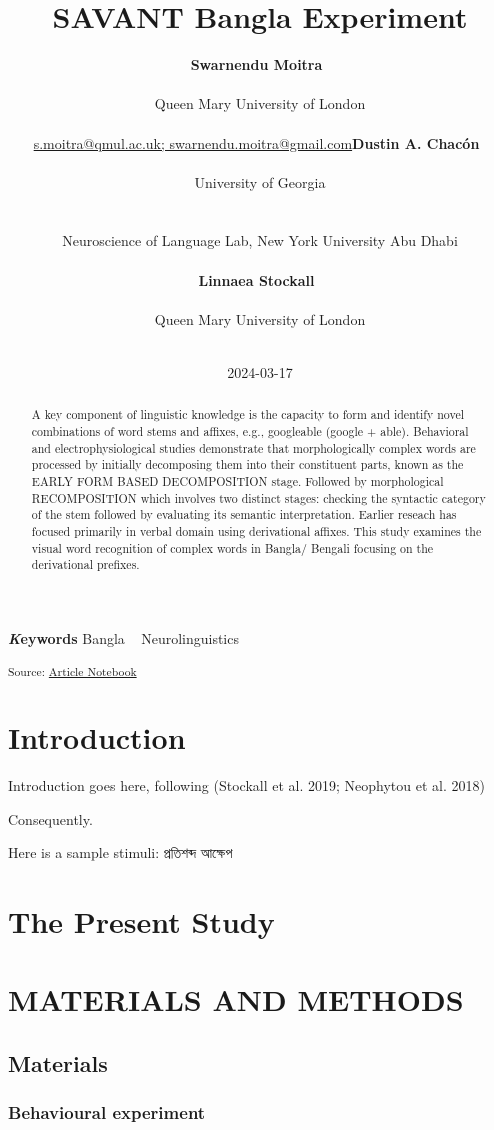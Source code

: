 \documentclass[
]{article}
\title{SAVANT Bangla Experiment}
\author{\textbf{Swarnendu
Moitra}~\orcidlink{0000-0001-6830-3284}\\\\Queen Mary University of
London\\\\\href{mailto:s.moitra@qmul.ac.uk;
swarnendu.moitra@gmail.com}{s.moitra@qmul.ac.uk;
swarnendu.moitra@gmail.com}\asep\textbf{Dustin A.
Chacón}~\orcidlink{0009-0002-8438-1914}\\\\University of
Georgia\\\\\\Neuroscience of Language Lab, New York University Abu
Dhabi\\\\\asep\textbf{Linnaea
Stockall}~\orcidlink{0000-0002-4700-5154}\\\\Queen Mary University of
London\\\\}
\date{2024-03-17}
\begin{document}
\maketitle
\begin{abstract}
A key component of linguistic knowledge is the capacity to form and
identify novel combinations of word stems and affixes, e.g., googleable
(google + able). Behavioral and electrophysiological studies demonstrate
that morphologically complex words are processed by initially
decomposing them into their constituent parts, known as the EARLY FORM
BASED DECOMPOSITION stage. Followed by morphological RECOMPOSITION which
involves two distinct stages: checking the syntactic category of the
stem followed by evaluating its semantic interpretation. Earlier reseach
has focused primarily in verbal domain using derivational affixes. This
study examines the visual word recognition of complex words in Bangla/
Bengali focusing on the derivational prefixes.
\end{abstract}
{\bfseries \emph Keywords}
\def\sep{\textbullet\ }
Bangla \sep 
Neurolinguistics


\textsubscript{Source:
\href{https://SwarMoi.github.io/Moitra-et-al_SAVANT/index.qmd.html}{Article
Notebook}}

\section{Introduction}\label{introduction}

Introduction goes here, following (Stockall et al. 2019; Neophytou et
al. 2018)

Consequently.

Here is a sample stimuli: প্রতিশব্দ আক্ষেপ

\section{The Present Study}\label{the-present-study}

\section{MATERIALS AND METHODS}\label{sec-data-methods}

\subsection{Materials}\label{materials}

\subsubsection{Behavioural experiment}\label{behavioural-experiment}
\end{document}
